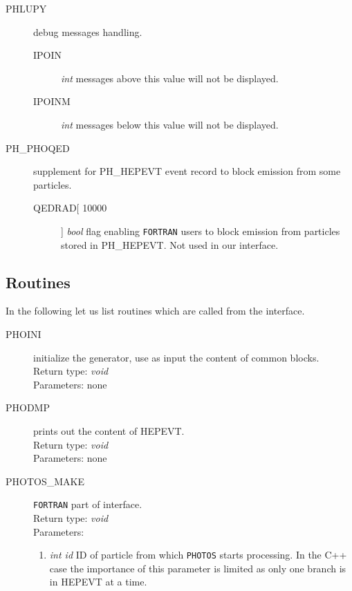 \documentclass[]{Photos_interface_design}
\begin{document}
\begin{description}
\item[PHLUPY] debug messages handling.
    \begin{description}
    \item[IPOIN]  \textit{int} messages above this value will not be displayed.
	\item[IPOINM] \textit{int} messages below this value will not be displayed.
    \end{description}
\end{description}

\begin{description}
\item[PH\_PHOQED] supplement for PH\_HEPEVT event record to block emission 
from some particles.
    \begin{description}
    \item[QEDRAD[ 10000]]  \textit{bool} flag enabling {\tt FORTRAN} users
    to block emission from particles stored in PH\_HEPEVT. Not used in 
     our interface.
    \end{description}
\end{description}

\subsection{Routines}

In the following let us list routines which are called from the interface.

\begin{description}
\item[PHOINI] initialize the generator, use as input the content of common blocks. \\
  Return type: \textit{void} \\
  Parameters: none
\end{description}

\begin{description}
\item[PHODMP] prints out the content of HEPEVT. \\
  Return type: \textit{void} \\
  Parameters: none
\end{description}

\begin{description}
\item[PHOTOS\_MAKE] {\tt FORTRAN} part of interface. \\
  Return type: \textit{void} \\
  Parameters:
  \begin{enumerate}
    \item \textit {int id} ID of particle from which {\tt PHOTOS} starts processing. In the C++ case the importance of this parameter is limited as only one branch is in HEPEVT at a time.
  \end{enumerate}
\end{description}
\end{document}
